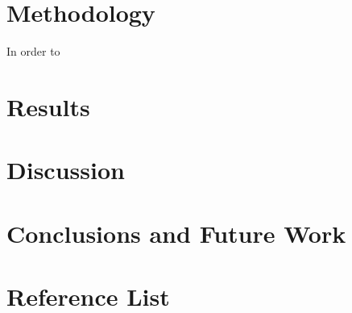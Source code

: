 \documentclass[11pt]{article}
\begin{document}
\newpage
\section{Methodology}
In order to 

\newpage
\section{Results}

\newpage
\section{Discussion}

\newpage
\section{Conclusions and Future Work}

\newpage
\section{Reference List}
\end{document}
